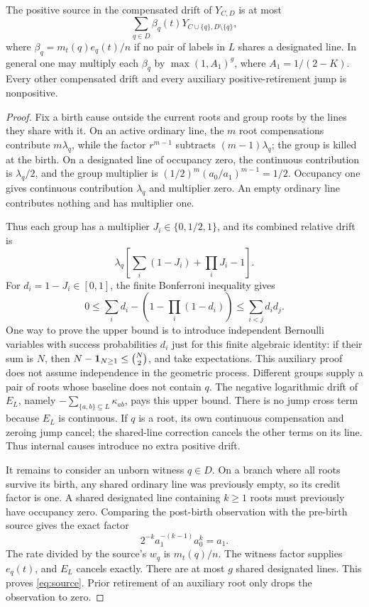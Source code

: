 \begin{lemma}\label{lem:source}
The positive source in the compensated drift of \(Y_{C,D}\) is at
most
\begin{equation}\label{eq:source}
 \sum_{q\in D}\beta_q(t)Y_{C\cup\{q\},D\setminus\{q\}},
\end{equation}
where \(\beta_q=m_t(q)e_q(t)/n\) if no pair of labels in \(L\) shares
a designated line. In general one may multiply each \(\beta_q\) by
\(\max(1,A_1)^g\), where \(A_1=1/(2-K)\).
Every other compensated drift and every auxiliary positive-retirement
jump is nonpositive.
\end{lemma}
\begin{proof}
Fix a birth cause outside the current roots and group roots by the
lines they share with it. On an active ordinary line, the \(m\) root
compensations contribute \(m\lambda_q\), while the factor
\(r^{m-1}\) subtracts \((m-1)\lambda_q\); the group is killed at the
birth. On a designated line of occupancy zero, the continuous
contribution is \(\lambda_q/2\), and the group multiplier is
\((1/2)^m(a_0/a_1)^{m-1}=1/2\). Occupancy one gives continuous
contribution \(\lambda_q\) and multiplier zero. An empty ordinary
line contributes nothing and has multiplier one.

Thus each group has a multiplier \(J_i\in\{0,1/2,1\}\), and its
combined relative drift is
\[
 \lambda_q\left[\sum_i(1-J_i)+\prod_iJ_i-1\right].
\]
For \(d_i=1-J_i\in[0,1]\), the finite Bonferroni inequality gives
\[
 0\le\sum_i d_i-\left(1-\prod_i(1-d_i)\right)
 \le\sum_{i<j}d_i d_j.
\]
One way to prove the upper bound is to introduce independent Bernoulli
variables with success probabilities \(d_i\) just for this finite
algebraic identity: if their sum is \(N\), then
\(N-\mathbf 1_{N\ge1}\le\binom N2\), and take expectations.
This auxiliary proof does not assume independence in the geometric
process. Different groups supply a pair of roots whose baseline does
not contain \(q\). The negative logarithmic drift of \(E_L\), namely
\(-\sum_{\{a,b\}\subseteq L}\kappa_{ab}\), pays this upper bound.
There is no jump cross term because \(E_L\) is continuous.
If \(q\) is a root, its own continuous compensation and zeroing jump
cancel; the shared-line correction cancels the other terms on its
line. Thus internal causes introduce no extra positive drift.

It remains to consider an unborn witness \(q\in D\). On a branch
where all roots survive its birth, any shared ordinary line was
previously empty, so its credit factor is one. A shared designated
line containing \(k\ge1\) roots must previously have occupancy zero.
Comparing the post-birth observation with the pre-birth source gives
the exact factor
\[
 2^{-k}a_1^{-(k-1)}a_0^k=a_1.
\]
The rate divided by the source's \(w_q\) is \(m_t(q)/n\).
The witness factor supplies \(e_q(t)\), and \(E_L\) cancels exactly.
There are at most \(g\) shared designated lines. This proves
\eqref{eq:source}. Prior retirement of an auxiliary root only drops
the observation to zero.
\end{proof}

